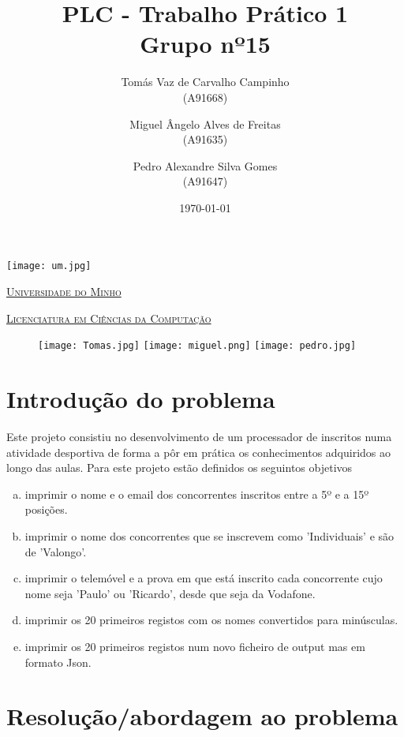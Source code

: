 \documentclass[11pt,a4paper]{report}
\title{PLC - Trabalho Prático 1\\
	\large Grupo nº15}
\author{Tomás Vaz de Carvalho Campinho \\ (A91668) \and Miguel Ângelo Alves de Freitas \\ (A91635)
         \and Pedro Alexandre Silva Gomes \\ (A91647)
       } %
\date{\today} %
\begin{document}
	\begin{minipage}{0.9\linewidth}
        \centering
		\texttt{[image: um.jpg]}\par\vspace{1cm}
		\href{https://www.uminho.pt/PT}
		{\scshape\LARGE Universidade do Minho} \par
		\vspace{0.6cm}
		\href{https://lcc.di.uminho.pt}
		{\scshape\Large Licenciatura em Ciências da Computação} \par
		\maketitle
		\begin{figure}[H]
			\texttt{[image: Tomas.jpg]}
			\texttt{[image: miguel.png]}
			\texttt{[image: pedro.jpg]}
		\end{figure}
	\end{minipage}
	
	\tableofcontents
	
	\pagebreak
	
	\chapter{Introdução do problema}
%	
	Este projeto consistiu no desenvolvimento de um processador de inscritos numa atividade desportiva de forma a pôr em prática os conhecimentos adquiridos ao longo das aulas. Para este projeto estão definidos os seguintos objetivos

    \begin{enumerate}[a.]
        \item imprimir o nome e o email dos concorrentes inscritos entre a 5º e a 15º posições.
        \item imprimir o nome dos concorrentes que se inscrevem como 'Individuais' e são de 'Valongo'.
        \item imprimir o telemóvel e a prova em que está inscrito cada concorrente cujo nome seja 'Paulo' ou 'Ricardo', desde que seja da Vodafone.
        \item imprimir os 20 primeiros registos com os nomes convertidos para minúsculas.
        \item imprimir os 20 primeiros registos num novo ficheiro de output mas em formato Json.
    \end{enumerate}
	
	\pagebreak
	\chapter{Resolução/abordagem ao problema}
\end{document}
